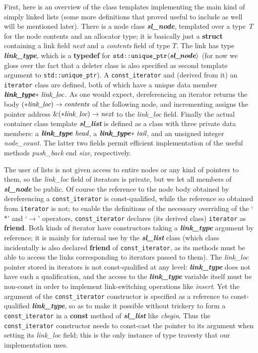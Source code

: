 \documentclass[12pt]{article}
\theoremstyle{plain}
\theoremstyle{definition}
\newcommand\std[1]{\texttt{std::#1}}
\def\uptr.{\std{unique\_ptr}}
\def\slnd.{\textbf{\textit{sl\_\!node}}}
\def\lnkt.{\textbf{\textit{link\_\!type}}}
\def\lnlc.{\textit{link\_\!loc}}
\def\slls.{\textbf{\textit{sl\_\!list}}}
\def\ang#1{\langle#1\rangle}
\begin{document}
First, here is an overview of the class templates implementing the main kind of
simply linked lists (some more definitions that proved useful to include as well
will be mentioned later). There is a node class \slnd., templated over a
type~$T$ for the node contents and an allocator type; it is basically just a
\textbf{struct} containing a link field \textit{next} and a \textit{contents}
field of type $T$. The link has type \lnkt., which is a \textbf{typedef} for
$\uptr.\ang{\slnd.}$ (for now we gloss over the fact that a deleter class is
also specified as second template argument to \uptr.). A
\texttt{const\_iterator} and (derived from it) an \texttt{iterator} class are
defined, both of which have a unique data member $\lnkt.{*}~\lnlc.$. As one
would expect, dereferencing an iterator returns the body
$({*}\lnlc.)\to\textit{contents}$ of the following node, and incrementing
assigns the pointer address $\&({*}\lnlc.)\to\textit{next}$ to the \lnlc. field.
Finally the actual container class template \slls. is defined as a class with
three private data members: a $\lnkt.~\textit{head}$, a
$\lnkt.{*}~\textit{tail}$, and an unsigned integer \textit{node\_count}. The
latter two fields permit efficient implementation of the useful methods
\textit{push\_back} end \textit{size}, respectively.

The user of lists is not given access to entire nodes or any kind of pointers to
them, so the \lnlc. field of iterators is private, but we let all members of
\slnd. be public. Of course the reference to the node body obtained by
dereferencing a \texttt{const\_iterator} is const-qualified, while the reference
so obtained from \texttt{iterator} is not; to enable the definitions of the
necessary overriding of the `$*$' and `$\to$' operators,
\texttt{const\_iterator} declares (its derived class) \texttt{iterator} as
\textbf{friend}. Both kinds of iterator have constructors taking a \lnkt.
argument by reference; it is mainly for internal use by the \slls. class (which
class incidentally is also declared \textbf{friend} of \texttt{const\_iterator},
as its methods must be able to access the links corresponding to iterators
passed to them). The \lnlc. pointer stored in iterators is not const-qualified
at any level: \lnkt. does not have such a qualification, and the access to the
\lnkt. variable itself must be non-const in order to implement link-switching
operations like \textit{insert}. Yet the argument of the
\texttt{const\_iterator} constructor is specified as a reference to
const-qualified \lnkt., so as to make it possible without trickery to form a
\texttt{const\_iterator} in a \textbf{const} method of \slls. like
\textit{cbegin}. Thus the \texttt{const\_iterator} constructor needs to
const-cast the pointer to its argument when setting its \lnlc. field; this is
the only instance of type travesty that our implementation uses.
\end{document}

